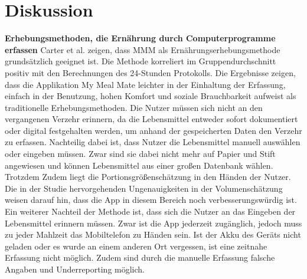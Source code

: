 \newpage
\section{Diskussion}

\textbf{Erhebungsmethoden, die Ernährung durch Computerprogramme erfassen}
Carter et al. zeigen, dass MMM als Ernährungserhebungsmethode grundsätzlich geeignet ist. Die Methode korreliert im Gruppendurchschnitt positiv mit den Berechnungen des 24-Stunden Protokolls. Die Ergebnisse zeigen, dass die Applikation My Meal Mate leichter in der Einhaltung der Erfassung, einfach in der Benutzung, hohen Komfort und soziale Brauchbarkeit aufweist als traditionelle Erhebungsmethoden. Die Nutzer müssen sich nicht an den vergangenen Verzehr erinnern, da die Lebensmittel entweder sofort dokumentiert oder digital festgehalten werden, um anhand der gespeicherten Daten den Verzehr zu erfassen. Nachteilig dabei ist, dass Nutzer die Lebensmittel manuell auswählen oder eingeben müssen. Zwar sind sie dabei nicht mehr auf Papier und Stift angewiesen und können Lebensmittel aus einer großen Datenbank wählen. Trotzdem Zudem liegt die  Portionsgrößenschätzung in den Händen der Nutzer. Die in der Studie hervorgehenden Ungenauigkeiten in der  Volumenschätzung weisen darauf hin, dass die App in diesem Bereich noch verbesserungswürdig ist. Ein weiterer Nachteil der Methode ist, dass sich die Nutzer an das Eingeben der Lebensmittel erinnern müssen. Zwar ist die App jederzeit zugänglich, jedoch muss zu jeder Mahlzeit das Mobiltelefon zu Händen sein. Ist der Akku des Geräts nicht geladen oder es wurde an einem anderen Ort vergessen, ist eine zeitnahe Erfassung nicht möglich. Zudem sind durch die manuelle Erfassung falsche Angaben und Underreporting möglich. \\

